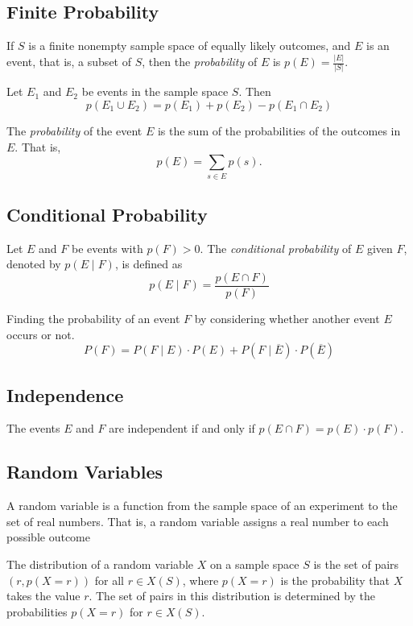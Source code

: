 \documentclass{article}
\begin{document}
\subsection{Finite Probability}
\begin{theorem}
    If \( S \) is a finite nonempty sample space of equally likely outcomes, and \( E \) is an event, that is, a subset of \( S \), then the \textit{probability} of \( E \) is \( p(E) = \frac{|E|}{|S|} \).
\end{theorem}
\begin{theorem}
    Let \(E_1 \) and \(E_2\) be events in the sample space \(S \). Then \
    \[
    p(E_1 \cup E_2) = p(E_1) + p(E_2) - p(E_1 \cap E_2)
    \]
\end{theorem}
\begin{definition}
    The \textit{probability} of the event \( E \) is the sum of the probabilities of the outcomes in \( E \). That is,
    \[p(E) = \sum_{s \in E} p(s).\]
\end{definition}
\subsection{Conditional Probability}
\begin{definition}
    Let \( E \) and \( F \) be events with \( p(F) > 0 \). The \textit{conditional probability} of \( E \) given \( F \), denoted by \( p(E \mid F) \), is defined as
    \[
    p(E \mid F) = \frac{p(E \cap F)}{p(F)}
    \]
\end{definition}
\begin{theorem}
    Finding the probability of an event \(F\) by considering whether another event \(E\) occurs or not.
    \[ 
    P(F) = P(F \mid E) \cdot P(E) + P(F \mid \overline{E}) \cdot P(\overline{E})
    \]
\end{theorem}
\subsection{Independence}
\begin{definition}
    The events \(E \) and \(F \) are independent if and only if \(p(E \cap F) = p(E) \cdot p(F)\).
\end{definition}

\subsection{Random Variables}
\begin{definition}
    A random variable is a function from the sample space of an experiment to the set of real numbers. That is, a random variable assigns a real number to each possible outcome
\end{definition}
\begin{definition}
    The distribution of a random variable \(X \) on a sample space \(S \) is the set of pairs \((r, p(X = r))\) for all \(r \in X(S) \), where \(p(X = r)\) is the probability that \(X\) takes the value \(r\).
    The set of pairs in this distribution is determined by the probabilities \(p(X = r)\) for \(r \in X(S)\).
\end{definition}
\end{document}
